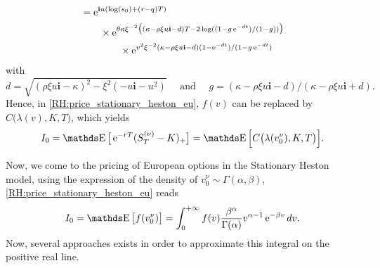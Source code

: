 \begin{example}[Call]
\begin{equation}
\begin{aligned}
			 & = \operatorname{e}^{ \textbf{i} u ( \log(s_0) + (r-q)T ) }                                                                                      \\
			 & \qquad \times \operatorname{e}^{ \theta \kappa \xi^{-2} \big( (\kappa - \rho \xi u \textbf{i} - d)T - 2 \log ( (1-g \operatorname{e}^{-dt}) / (1-g) ) \big) } \\
			 & \qquad \qquad \times \operatorname{e}^{ v^2 \xi^{-2} (\kappa - \rho \xi u \textbf{i} - d) (1 - \operatorname{e}^{-dt}) / (1-g\operatorname{e}^{-dt}) }                      \\
		\end{aligned}
	\end{equation}
	with
	\begin{equation}
		d = \sqrt{ ( \rho \xi u \textbf{i} - \kappa )^2 - \xi^2( - u \textbf{i} - u^2 ) } \quad \mbox{ and }\quad g = (\kappa - \rho \xi u \textbf{i} - d) / (\kappa - \rho \xi u \textbf{i} + d).
	\end{equation}
	Hence, in \eqref{RH:price_stationary_heston_eu}, $f(v)$ can be replaced by $C \big( \lambda(v), K, T \big)$, which yields
	\begin{equation}
		I_0 = \E \big[ \e^{-r T} ( S_T^{(\nu)} - K )_+ \big] = \E \Big[ C \big( \lambda(v_0^{\nu}), K, T \big) \Big].
	\end{equation}

\end{example}



Now, we come to the pricing of European options in the Stationary Heston model, using the expression of the density of $v_0^{\nu} \sim \Gamma (\alpha, \beta)$, \eqref{RH:price_stationary_heston_eu} reads
\begin{equation}
	I_0 = \E \big[ f (v_0^{\nu}) \big] = \int_0^{+ \infty} f (v) \frac{\beta^{\alpha}}{\Gamma(\alpha)} v^{\alpha -1} \e^{- \beta v} dv.
\end{equation}
Now, several approaches exists in order to approximate this integral on the positive real line.

